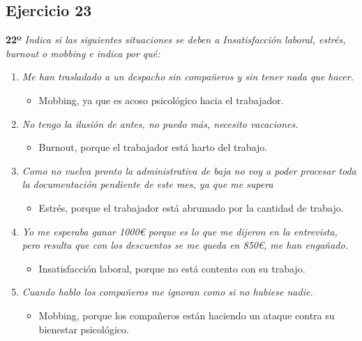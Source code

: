 \documentclass{article}
\begin{document}
      \subsection{Ejercicio 23}

        \textbf{22º} \textit{Indica si las siguientes situaciones se deben a Insatisfacción laboral, estrés, burnout o mobbing e indica por qué:}
        
        \begin{enumerate}[label=(\alph*)]
          \item \textit{Me han trasladado a un despacho sin compañeros y sin tener nada que hacer.}
            \begin{itemize}
              \item Mobbing, ya que es acoso psicológico hacia el trabajador.
            \end{itemize}
          \item \textit{No tengo la ilusión de antes, no puedo más, necesito vacaciones.}
            \begin{itemize}
              \item Burnout, porque el trabajador está harto del trabajo.
            \end{itemize}
          \item \textit{Como no vuelva pronto la administrativa de baja no voy a poder procesar toda la documentación pendiente de este mes, ya que me supera}
            \begin{itemize}
              \item Estrés, porque el trabajador está abrumado por la cantidad de trabajo.
            \end{itemize}
          \item \textit{Yo me esperaba ganar 1000€ porque es lo que me dijeron en la entrevista, pero resulta que con los descuentos se me queda en 850€, me han engañado.}
            \begin{itemize}
              \item Insatisfacción laboral, porque no está contento con su trabajo.
            \end{itemize}
          \item \textit{Cuando hablo los compañeros me ignoran como si no hubiese nadie.}
            \begin{itemize}
              \item Mobbing, porque los compañeros están haciendo un ataque contra su bienestar psicológico.
            \end{itemize}
        \end{enumerate}
\end{document}
